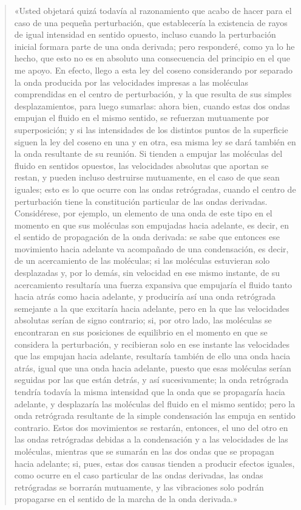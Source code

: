 \begin{quote}
«Usted objetará quizá todavía al razonamiento que acabo de hacer para el
caso de una pequeña perturbación, que establecería la existencia de rayos
de igual intensidad en sentido opuesto, incluso cuando la perturbación
inicial formara parte de una onda derivada; pero responderé, como ya lo he
hecho, que esto no es en absoluto una consecuencia del principio en el que
me apoyo. En efecto, llego a esta ley del coseno considerando por separado
la onda producida por las velocidades impresas a las moléculas comprendidas
en el centro de perturbación, y la que resulta de sus simples
desplazamientos, para luego sumarlas: ahora bien, cuando estas dos ondas
empujan el fluido en el mismo sentido, se refuerzan mutuamente por
superposición; y si las intensidades de los distintos puntos de la
superficie siguen la ley del coseno en una y en otra, esa misma ley se dará
también en la onda resultante de su reunión. Si tienden a empujar las
moléculas del fluido en sentidos opuestos, las velocidades absolutas que
aportan se restan, y pueden incluso destruirse mutuamente, en el caso de
que sean iguales; esto es lo que ocurre con las ondas retrógradas, cuando
el centro de perturbación tiene la constitución particular de las ondas
derivadas. Considérese, por ejemplo, un elemento de una onda de este tipo
en el momento en que sus moléculas son empujadas hacia adelante, es decir,
en el sentido de propagación de la onda derivada: se sabe que entonces ese
movimiento hacia adelante va acompañado de una condensación, es decir, de
un acercamiento de las moléculas; si las moléculas estuvieran solo
desplazadas y, por lo demás, sin velocidad en ese mismo instante, de su
acercamiento resultaría una fuerza expansiva que empujaría el fluido tanto
hacia atrás como hacia adelante, y produciría así una onda retrógrada
semejante a la que excitaría hacia adelante, pero en la que las velocidades
absolutas serían de signo contrario; si, por otro lado, las moléculas se
encontraran en sus posiciones de equilibrio en el momento en que se
considera la perturbación, y recibieran solo en ese instante las
velocidades que las empujan hacia adelante, resultaría también de ello una
onda hacia atrás, igual que una onda hacia adelante, puesto que esas
moléculas serían seguidas por las que están detrás, y así sucesivamente;
la onda retrógrada tendría todavía la misma intensidad que la onda que se
propagaría hacia adelante, y desplazaría las moléculas del fluido en el
mismo sentido; pero la onda retrógrada resultante de la simple condensación
las empuja en sentido contrario. Estos dos movimientos se restarán,
entonces, el uno del otro en las ondas retrógradas debidas a la
condensación y a las velocidades de las moléculas, mientras que se sumarán
en las dos ondas que se propagan hacia adelante; si, pues, estas dos causas
tienden a producir efectos iguales, como ocurre en el caso particular de
las ondas derivadas, las ondas retrógradas se borrarán mutuamente, y las
vibraciones solo podrán propagarse en el sentido de la marcha de la onda
derivada.»
\end{quote}

